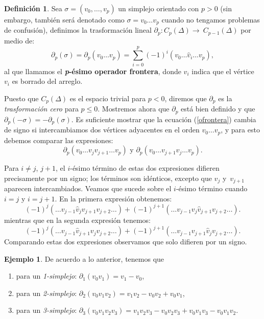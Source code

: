 \documentclass[12pt]{book}
\theoremstyle{definition}
\newtheorem{definition}[theorem]{Definición}
\newtheorem{example}[theorem]{Ejemplo}
\newcounter{in}
\newcounter{ini}
\begin{document}
\begin{definition}
  Sea $\sigma=(v_{0},\ldots ,v_{p})$ un simplejo orientado con $p>0$
  (sin embargo, también será denotado como $\sigma=v_{0}\ldots v_{p}$
  cuando no tengamos problemas de confusión),
  definimos la trasformación lineal
  $\partial_{p}:C_{p}(\Delta)\rightarrow~C_{p-1}(\Delta)$ por medio de:
  \begin{equation}
    \label{ofrontera}
    \partial_{p}(\sigma)=\partial_{p}(v_{0}\ldots
    v_{p})=\sum^{p}_{i=0}(-1)^{i}(v_{0}\ldots \widehat v_{i}\ldots v_{p}),
  \end{equation}
  al que llamamos el \textbf{\emph{p}-ésimo operador frontera}, donde
  $\widehat v_{i}$ indica que el vértice $v_{i}$ es borrado del arreglo.
\end{definition}

Puesto que $C_{p}(\Delta)$ es el espacio trivial para $p<0$, diremos
que $\partial_{p}$ es la \textit{trasformación cero} para $p\leq
0$. Mostremos ahora que $\partial_{p}$ está bien definido y que
$\partial_{p}(-\sigma)=-\partial_{p}(\sigma)$. Es suficiente
mostrar que la ecuación (\ref{ofrontera}) cambia de signo si intercambiamos dos
vértices adyacentes en el orden $v_{0}\ldots v_{p}$, y para esto
debemos comparar las expresiones:
$$\partial_{p}(v_{0}\ldots v_{j} v_{j+1} \ldots v_{p}) \mbox{ y } \partial_{p}(v_{0}\ldots v_{j+1} v_{j} \ldots v_{p}).$$

Para $i\neq j$, $j+1$, el $i$-ésimo término de estas dos expresiones
difieren precisamente por un signo; los términos son idénticos,
excepto que $v_{j}$ y~$v_{j+1}$ aparecen intercambiados. Veamos que
sucede sobre el $i$-ésimo término cuando $i=j$ y $i=j+1$. En la primera
expresión obtenemos:
$$(-1)^{j}(\ldots v_{j-1} \widehat v_{j}v_{j+1}v_{j+2}\ldots)+(-1)^{j+1}(\ldots v_{j-1}v_{j}\widehat v_{j+1}v_{j+2}\ldots).$$
mientras que en la segunda expresión tenemos:
$$(-1)^{j}(\ldots v_{j-1}\widehat v_{j+1}v_{j}v_{j+2}\ldots)+(-1)^{j+1}(\ldots v_{j-1}v_{j+1}\widehat v_{j}v_{j+2}\ldots).$$
Comparando estas dos expresiones observamos que solo difieren por un signo.

\begin{example}
  De acuerdo a lo anterior, tenemos que
  \begin{enumerate}
  \item para un \emph{1-simplejo}: $\partial_{1}(v_{0}v_{1})= v_{1}-v_{0}$,
  \item para un \emph{2-simplejo}: $\partial_{2}(v_{0}v_{1}v_{2})=v_{1}v_{2}-v_{0}v_{2}+v_{0}v_{1}$,
  \item para un \emph{3-simplejo}:
    $\partial_{3}(v_{0}v_{1}v_{2}v_{3})=v_{1}v_{2}v_{3}-v_{0}v_{2}v_{3}+v_{0}v_{1}v_{3}-v_{0}v_{1}v_{2}$. 
  \end{enumerate}
\end{example}
\end{document}
